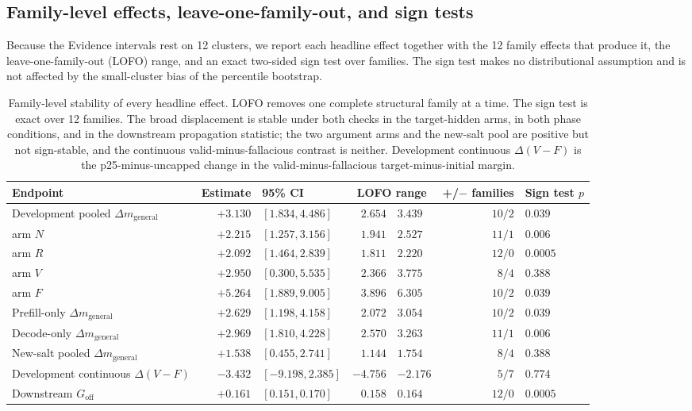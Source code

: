 \documentclass[letterpaper]{article}
\begin{document}
\subsection{Family-level effects, leave-one-family-out, and sign tests}

Because the Evidence intervals rest on 12 clusters, we report each headline effect together with the 12 family effects that produce it, the leave-one-family-out (LOFO) range, and an exact two-sided sign test over families. The sign test makes no distributional assumption and is not affected by the small-cluster bias of the percentile bootstrap.

\begin{table}[t]
\centering
\small
\begin{tabular}{lrlrlrl}
\toprule
Endpoint & Estimate & 95\% CI & \multicolumn{2}{c}{LOFO range} & +/$-$ families & Sign test $p$ \\
\midrule
Development pooled $\Delta m_{\mathrm{general}}$ & $+3.130$ & $[1.834,4.486]$ & $2.654$ & $3.439$ & $10/2$ & $0.039$ \\
\quad arm $N$ & $+2.215$ & $[1.257,3.156]$ & $1.941$ & $2.527$ & $11/1$ & $0.006$ \\
\quad arm $R$ & $+2.092$ & $[1.464,2.839]$ & $1.811$ & $2.220$ & $12/0$ & $0.0005$ \\
\quad arm $V$ & $+2.950$ & $[0.300,5.535]$ & $2.366$ & $3.775$ & $8/4$ & $0.388$ \\
\quad arm $F$ & $+5.264$ & $[1.889,9.005]$ & $3.896$ & $6.305$ & $10/2$ & $0.039$ \\
Prefill-only $\Delta m_{\mathrm{general}}$ & $+2.629$ & $[1.198,4.158]$ & $2.072$ & $3.054$ & $10/2$ & $0.039$ \\
Decode-only $\Delta m_{\mathrm{general}}$ & $+2.969$ & $[1.810,4.228]$ & $2.570$ & $3.263$ & $11/1$ & $0.006$ \\
New-salt pooled $\Delta m_{\mathrm{general}}$ & $+1.538$ & $[0.455,2.741]$ & $1.144$ & $1.754$ & $8/4$ & $0.388$ \\
Development continuous $\Delta(V-F)$ & $-3.432$ & $[-9.198,2.385]$ & $-4.756$ & $-2.176$ & $5/7$ & $0.774$ \\
Downstream $G_{\mathrm{off}}$ & $+0.161$ & $[0.151,0.170]$ & $0.158$ & $0.164$ & $12/0$ & $0.0005$ \\
\bottomrule
\end{tabular}
\caption{Family-level stability of every headline effect. LOFO removes one complete structural family at a time. The sign test is exact over 12 families. The broad displacement is stable under both checks in the target-hidden arms, in both phase conditions, and in the downstream propagation statistic; the two argument arms and the new-salt pool are positive but not sign-stable, and the continuous valid-minus-fallacious contrast is neither. Development continuous $\Delta(V-F)$ is the p25-minus-uncapped change in the valid-minus-fallacious target-minus-initial margin.}
\label{tab:supp-family}
\end{table}
\end{document}
